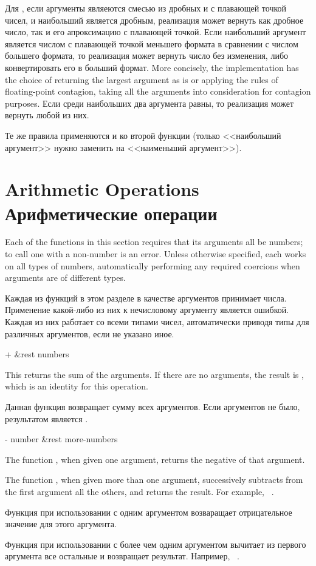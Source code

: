 \begin{defun}[Function]
Для , если аргументы являеются смесью из дробных и с плавающей точкой
чисел, и наибольший является дробным, реализация может вернуть как дробное
число, так и его апроксимацию с плавающей точкой.
Если наибольший аргумент является числом с плавающей точкой меньшего формата в
сравнении с числом большего формата, то реализация может вернуть число без
изменения, либо конвертировать его в больший формат.
More concisely, the implementation has the choice of returning the largest
argument as is or applying the rules of floating-point contagion,
taking all the arguments into consideration for contagion purposes.
Если среди наибольших два аргумента равны, то реализация может вернуть любой из
них.

Те же правила применяются и ко второй функции  (только <<наибольший
аргумент>> нужно заменить на <<наименьший аргумент>>).
\end{defun}

\section{Arithmetic Operations Арифметические операции}

Each of the functions in this section requires that its arguments all be
numbers; to call one with a non-number is an error.  Unless otherwise
specified, each works on all types of numbers, automatically performing
any required coercions when arguments are of different types.

Каждая из функций в этом разделе в качестве аргументов принимает числа. Применение
какой-либо из них к нечисловому аргументу является ошибкой. Каждая из них
работает со всеми типами чисел, автоматически приводя типы для различных
аргументов, если не указано иное.

\begin{defun}[Function]
+ &rest numbers

This returns the sum of the arguments.  If there are no arguments, the result
is , which is an identity for this operation.

Данная функция возвращает сумму всех аргументов. Если аргументов не было,
результатом является .
\end{defun}

\begin{defun}[Function]
- number &rest more-numbers

The function \cdf{-}, when given one argument, returns the negative
of that argument.

The function \cdf{-}, when given more than one argument, successively subtracts
from the first argument all the others, and returns the result.
For example,  \EV\ .

Функция \cdf{-} при использовании с одним аргументом возваращает отрицательное
значение для этого аргумента.

Функция \cdf{-} при использовании с более чем одним аргументом вычитает из
первого аргумента все остальные и возвращает результат.
Например,  \EV\ .
\end{defun}

